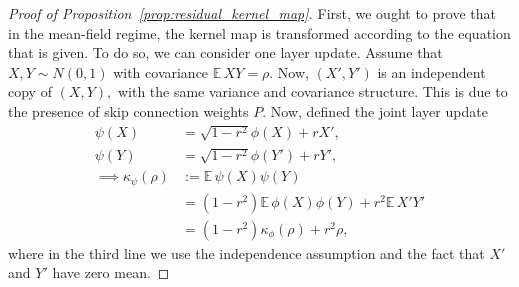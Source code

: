 \documentclass[twoside]{article}
\newcommand{\km}{\kappa_\phi}
\newcommand{\E}{\mathbb{E}\,}
\theoremstyle{definition}
\begin{document}
\begin{proof}[Proof of Proposition~\ref{prop:residual_kernel_map}]
First, we ought to prove that in the mean-field regime, the kernel map is transformed according to the equation that is given. To do so, we can consider one layer update. Assume that $X,Y\sim N(0,1)$ with covariance $\E XY = \rho.$ Now, $(X',Y')$ is an independent copy of $(X,Y),$ with the same variance and covariance structure. This is due to the presence of skip connection weights $P.$ Now, defined the joint layer update 
\begin{align*}
\psi(X) &= \sqrt{1-r^2} \phi(X)  + r X',\\
\psi(Y) &= \sqrt{1-r^2} \phi(Y')  + r Y',\\
\implies \kappa_\psi(\rho)&:= \E \psi(X)\psi(Y) \\
&=  (1-r^2) \E \phi(X)\phi(Y) + r^2 \E X' Y' \\
    &= (1-r^2) \km(\rho) + r^2 \rho,
\end{align*}
where in the third line we use the independence assumption and the fact that $X'$ and $Y'$ have zero mean. 


\end{proof}
\end{document}
